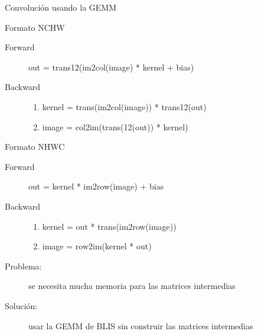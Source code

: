 \documentclass[aspectratio=43]{beamer}
\begin{document}
\begin{frame}{Convolución usando la GEMM}

\begin{block}{Formato NCHW}
\begin{description}
    \item[Forward] out = trans12(im2col(image) * kernel + bias)
    \item[Backward]
    \begin{enumerate}
        \item kernel = trans(im2col(image)) * trans12(out)
        \item image = col2im(trans(12(out)) * kernel)
    \end{enumerate}
\end{description}
\end{block}

\begin{block}{Formato NHWC}
\begin{description}
    \item[Forward] out = kernel * im2row(image) + bias
    \item[Backward]
    \begin{enumerate}
        \item kernel = out * trans(im2row(image))
        \item image = row2im(kernel * out)
    \end{enumerate}
\end{description}
\end{block}

\begin{description}
    \item[Problema:] se necesita mucha memoria para las matrices intermedias

    \item[Solución:] usar la GEMM de BLIS sin construir las matrices intermedias
\end{description}

\end{frame}
\end{document}
